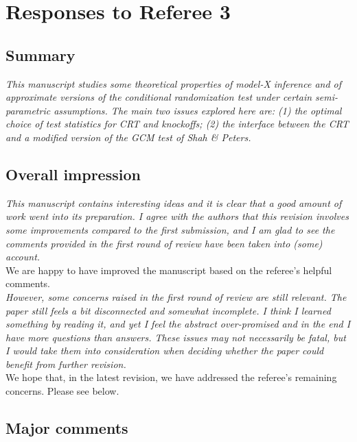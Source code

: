 \documentclass[12pt]{article}
\begin{document}
\section{Responses to Referee 3}

\subsection{Summary}

\textsl{This manuscript studies some theoretical properties of model-X inference and of approximate versions of the conditional randomization test under certain semi-parametric assumptions. The main two issues explored here are: (1) the optimal choice of test statistics for CRT and knockoffs; (2) the interface between the CRT and a modified version of the GCM test of Shah \& Peters.}

\subsection{Overall impression}

\textsl{This manuscript contains interesting ideas and it is clear that a good amount of work went into its preparation. I agree with the authors that this revision involves some improvements compared to the first submission, and I am glad to see the comments provided in the first round of review have been taken into (some) account.} 
\\

\noindent We are happy to have improved the manuscript based on the referee's helpful comments.
\\

\textsl{However, some concerns raised in the first round of review are still relevant. The paper still feels a bit disconnected and somewhat incomplete. I think I learned something by reading it, and yet I feel the abstract over-promised and in the end I have more questions than answers. These issues may not necessarily be fatal, but I would take them into consideration when deciding whether the paper could benefit from further revision.}
\\

\noindent We hope that, in the latest revision, we have addressed the referee's remaining concerns. Please see below.

\subsection{Major comments}
\end{document}
